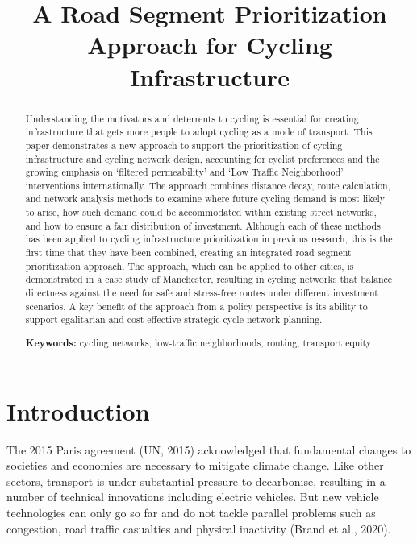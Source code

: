 \documentclass[
]{article}
\title{A Road Segment Prioritization Approach for Cycling Infrastructure}
\author{}
\date{\vspace{-2.5em}}
\begin{document}
\maketitle
\begin{abstract}
Understanding the motivators and deterrents to cycling is essential for creating infrastructure that gets more people to adopt cycling as a mode of transport. This paper demonstrates a new approach to support the prioritization of cycling infrastructure and cycling network design, accounting for cyclist preferences and the growing emphasis on `filtered permeability' and `Low Traffic Neighborhood' interventions internationally. The approach combines distance decay, route calculation, and network analysis methods to examine where future cycling demand is most likely to arise, how such demand could be accommodated within existing street networks, and how to ensure a fair distribution of investment. Although each of these methods has been applied to cycling infrastructure prioritization in previous research, this is the first time that they have been combined, creating an integrated road segment prioritization approach. The approach, which can be applied to other cities, is demonstrated in a case study of Manchester, resulting in cycling networks that balance directness against the need for safe and stress-free routes under different investment scenarios. A key benefit of the approach from a policy perspective is its ability to support egalitarian and cost-effective strategic cycle network planning.

\par

\textbf{Keywords:} cycling networks, low-traffic neighborhoods, routing, transport equity
\end{abstract}

\hypertarget{introduction}{%
\section{Introduction}\label{introduction}}

The 2015 Paris agreement (UN, 2015) acknowledged that
fundamental changes to societies and economies are necessary to mitigate
climate change. Like other sectors, transport is under substantial
pressure to decarbonise, resulting in a number of technical innovations
including electric vehicles. But new vehicle technologies can only go so
far and do not tackle parallel problems such as congestion, road traffic
casualties and physical inactivity (Brand et al., 2020).
\end{document}
